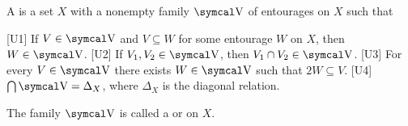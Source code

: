 \begin{definition}\label{def:uniform_space}\cite[section 8.1]{Engelking1989}
  A  is a set \( X \) with a nonempty family \( \CV \) of entourages on \( X \) such that
  \begin{defenum}
    [U1] If \( V \in \CV \) and \( V \subseteq W \) for some entourage \( W \) on \( X \), then \( W \in \CV \).
    [U2] If \( V_1, V_2 \in \CV \), then \( V_1 \cap V_2 \in \CV \).
    [U3] For every \( V \in \CV \) there exists \( W \in \CV \) such that \( 2W \subseteq V \).
    [U4] \( \bigcap \CV = \Delta_X \), where \( \Delta_X \) is the diagonal relation.
  \end{defenum}

  The family \( \CV \) is called a  or  on \( X \).
\end{definition}

